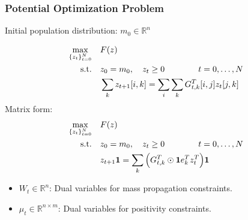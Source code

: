\documentclass[]{article}
\newcommand{\mbf}{\mathbf}
\newcommand{\mb}{\mathbb}
\begin{document}
\subsubsection*{Potential Optimization Problem}
Initial population distribution: $m_0 \in \mb{R}^n$

\begin{align}
\max_{\{z_t\}_{t=0}^N} & \quad F(z) \label{eq:potopt} \\
\text{s.t.} & \quad z_0 = m_0, \quad z_t \geq 0  \qquad \qquad t=0,\dots, N \notag \\
& \quad \sum_k z_{t+1}[i,k] = \sum_i \sum_k G_{t,k}^T[i,j] z_t[j,k] \notag
\end{align}
Matrix form:
\begin{align}
\max_{\{z_t\}_{t=0}^N} & \quad F(z) \\ 
\text{s.t.} & \quad z_0 = m_0, \quad z_t \geq 0  \qquad \qquad t=0,\dots, N \notag \\
& \quad z_{t+1}\mbf{1} = \sum_k \Big(G_{t,k}^T \odot \mbf{1}e_k^T z_t^T\Big)\mbf{1} \notag
\end{align}

\begin{itemize}
\item $W_t \in \mb{R}^n$:  Dual variables for mass propagation constraints.
\item $\mu_t \in \mb{R}^{n \times m}$:  Dual variables for positivity constraints.
\end{itemize}
\end{document}
